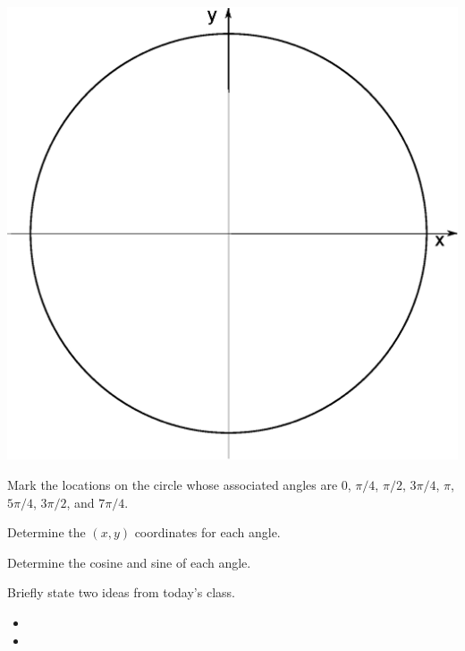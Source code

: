 \begin{problem}
  \includegraphics[width=16cm]{trig/img/blankCircle}

  \begin{subproblem}
  \item Mark the locations on the circle whose associated angles are
    0, $\pi/4$, $\pi/2$, $3\pi/4$, $\pi$, $5\pi/4$, $3\pi/2$, and
    $7\pi/4$.
    \clearpage

  \item Determine the $(x,y)$ coordinates for each angle.
    \vfill
  \item Determine the cosine and sine of each angle.
    \vfill
  \end{subproblem}

\end{problem}

\postClass

\begin{problem}
\item Briefly state two ideas from today's class.
  \begin{itemize}
  \item 
  \item 
  \end{itemize}
\item 
  \begin{subproblem}
    \item
  \end{subproblem}
\end{problem}



